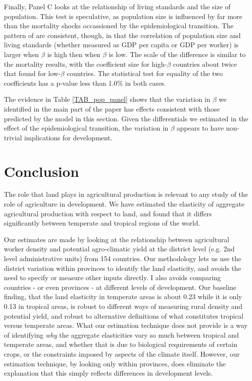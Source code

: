 \documentclass[11pt]{article}
\begin{document}
Finally, Panel C looks at the relationship of living standards and the size of population. This test is speculative, as population size is influenced by far more than the mortality shocks occassioned by the epidemiological transition. The pattern of are consistent, though, in that the correlation of population size and living standards (whether measured as GDP per capita or GDP per worker) is larger when $\beta$ is high then when $\beta$ is low. The scale of the difference is similar to the mortality results, with the coefficient size for high-$\beta$ countries about twice that found for low-$\beta$ countries. The statistical test for equality of the two coefficients has a p-value less than 1.0\% in both cases.

The evidence in Table \ref{TAB_pop_panel} shows that the variation in $\beta$ we identified in the main part of the paper has effects consistent with those predicted by the model in this section. Given the differentials we estimated in the effect of the epidemiological transition, the variation in $\beta$ appears to have non-trivial implications for development.

\section{Conclusion}
The role that land plays in agricultural production is relevant to any study of the role of agriculture in development. We have estimated the elasticity of aggregate agricultural production with respect to land, and found that it differs significantly between temperate and tropical regions of the world.

Our estimates are made by looking at the relationship between agricultural worker density and potential agro-climatic yield at the district level (e.g. 2nd level administrative units) from 154 countries. Our methodology lets us use the district variation within provinces to identify the land elasticity, and avoids the need to specify or measure other inputs directly. I also avoids comparing countries - or even provinces - at different levels of development. Our baseline finding, that the land elasticity in temperate areas is about 0.23 while it is only 0.13 in tropical areas, is robust to different ways of measuring rural density and potential yield, and robust to alternative definitions of what constitutes tropical versus temperate areas. What our estimation technique does not provide is a way of identifying \textit{why} the aggregate elasticities vary so much between tropical and temperate areas, and whether that is due to biological requirements of certain crops, or the constraints imposed by aspects of the climate itself. However, our estimation technique, by looking only within provinces, does eliminate the explanation that this simply reflects differences in development levels.
\end{document}
